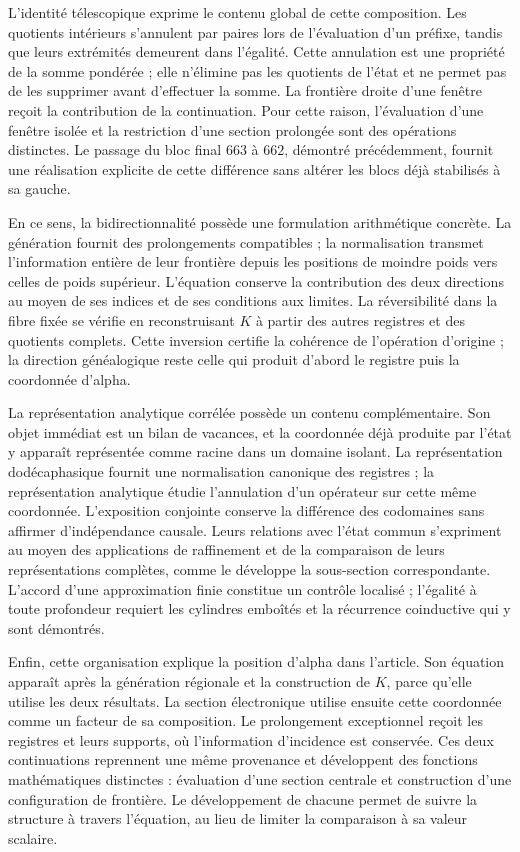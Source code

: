 L'identité télescopique exprime le contenu global de cette composition.
Les quotients intérieurs s'annulent par paires lors de l'évaluation d'un préfixe,
tandis que leurs extrémités demeurent dans l'égalité. Cette annulation est une
propriété de la somme pondérée ; elle n'élimine pas les quotients de l'état et
ne permet pas de les supprimer avant d'effectuer la somme. La frontière droite d'une
fenêtre reçoit la contribution de la continuation. Pour cette raison,
l'évaluation d'une fenêtre isolée et la restriction d'une section
prolongée sont des opérations distinctes. Le passage du bloc final $663$ à
$662$, démontré précédemment, fournit une réalisation explicite de cette
différence sans altérer les blocs déjà stabilisés à sa gauche.

En ce sens, la bidirectionnalité possède une formulation arithmétique
concrète. La génération fournit des prolongements compatibles ; la
normalisation transmet l'information entière de leur frontière depuis les
positions de moindre poids vers celles de poids supérieur. L'équation conserve la
contribution des deux directions au moyen de ses indices et de ses conditions
aux limites. La réversibilité dans la fibre fixée se vérifie en reconstruisant
$K$ à partir des autres registres et des quotients complets. Cette
inversion certifie la cohérence de l'opération d'origine ; la direction
généalogique reste celle qui produit d'abord le registre puis
la coordonnée d'alpha.

La représentation analytique corrélée possède un contenu complémentaire. Son objet immédiat est un bilan de vacances, et la coordonnée déjà produite par l'état y apparaît représentée comme racine dans un domaine isolant. La représentation dodécaphasique fournit une normalisation canonique des registres ; la représentation analytique étudie l'annulation d'un opérateur sur cette même coordonnée. L'exposition conjointe conserve la différence des codomaines sans affirmer d'indépendance causale. Leurs relations avec l'état commun s'expriment au moyen des applications de raffinement et de la comparaison de leurs représentations complètes, comme le développe la sous-section correspondante. L'accord d'une approximation finie constitue un contrôle localisé ; l'égalité à toute profondeur requiert les cylindres emboîtés et la récurrence coinductive qui y sont démontrés.

Enfin, cette organisation explique la position d'alpha dans l'article.
Son équation apparaît après la génération régionale et la construction
de $K$, parce qu'elle utilise les deux résultats. La section électronique utilise
ensuite cette coordonnée comme un facteur de sa composition. Le prolongement
exceptionnel reçoit les registres et leurs supports, où l'information
d'incidence est conservée. Ces deux continuations reprennent une même
provenance et développent des fonctions mathématiques distinctes : évaluation d'une
section centrale et construction d'une configuration de frontière.
Le développement de chacune permet de suivre la structure à travers
l'équation, au lieu de limiter la comparaison à sa valeur scalaire.
